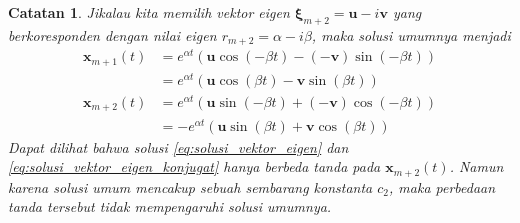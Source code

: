 \documentclass[a4paper]{article}
\theoremstyle{definisi}
\newtheorem{catatan}{Catatan}[subsection]
\newcommand{\bfxi}{\boldsymbol{\xi}}
\numberwithin{equation}{section}
\begin{document}
  \begin{catatan}
    Jikalau kita memilih vektor eigen $\bfxi_{m+2}=\mathbf{u}-i\mathbf{v}$ yang berkoresponden dengan nilai eigen $r_{m+2} = \alpha - i\beta$, maka solusi umumnya menjadi
    \begin{equation}\label{eq:solusi_vektor_eigen_konjugat}
      \begin{split}
        \mathbf{x}_{m+1}(t) &= e^{\alpha t}(\mathbf{u}\cos(-\beta t) - (-\mathbf{v})\sin(-\beta t))\\
        &= e^{\alpha t}(\mathbf{u}\cos(\beta t) - \mathbf{v}\sin(\beta t))\\
        \mathbf{x}_{m+2}(t) &= e^{\alpha t}(\mathbf{u}\sin(-\beta t) + (-\mathbf{v})\cos(-\beta t))\\
        &= -e^{\alpha t}(\mathbf{u}\sin(\beta t) + \mathbf{v}\cos(\beta t))
      \end{split}
    \end{equation}
    Dapat dilihat bahwa solusi \eqref{eq:solusi_vektor_eigen} dan \eqref{eq:solusi_vektor_eigen_konjugat} hanya berbeda tanda pada $\mathbf{x}_{m+2}(t)$. Namun karena solusi umum mencakup sebuah sembarang konstanta $c_2$, maka perbedaan tanda tersebut tidak mempengaruhi solusi umumnya.
  \end{catatan}
  
\end{document}
